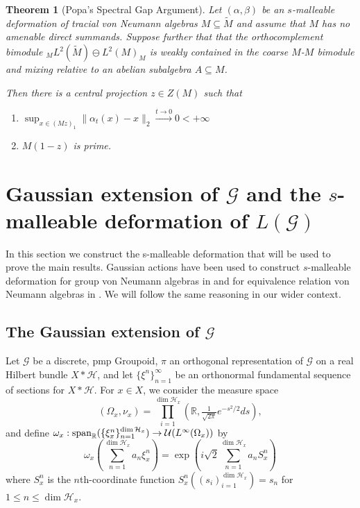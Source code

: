 \documentclass[a4paper,11pt]{article}
\numberwithin{equation}{section}
\newtheorem{thm}{Theorem}[section]
\theoremstyle{definition}
\theoremstyle{remark}
\numberwithin{equation}{section}
\newcommand{\rG}{\mathcal{G}}
\def\H{\mathcal H}
\def\R{\mathbb{R}}
\newcommand{\spn}{{\rm span}}
\newcommand{\U}{\mathcal{U}}
\def\sub{\subseteq}
\providecommand{\norm}[1]{\lVert#1\rVert}
\numberwithin{equation}{section}
\begin{document}
\begin{thm}[Popa's Spectral Gap Argument]\label{popaspectralgap}
    Let $ (\alpha,\beta) $ be an $ s $-malleable deformation of tracial von Neumann algebras $ M\sub \widetilde{M} $ and assume that $M$ has no amenable direct summands. Suppose further that that the orthocomplement bimodule $_{M} L^2(\widetilde{M}) \ominus L^2(M)_M $ is weakly contained in the coarse $M$-$M$ bimodule and mixing relative to an abelian subalgebra $A\sub M$.

    Then there is a central projection $z\in Z(M)$ such that 
    \begin{enumerate}
        \item $ \sup_{x\in (Mz)_{1}} \norm{\alpha_{t}(x)-x}_{2} \xrightarrow{t\to0}0 < +\infty $
        \item $M(1-z)$ is prime.
    \end{enumerate}
    
    
\end{thm}









\section{Gaussian extension of $\rG$ and the $s$-malleable deformation of $L(\rG)$} 

In this section we construct the s-malleable deformation that will be used to prove the main results. Gaussian actions have been used to construct $s$-malleable deformation for group von Neumann algebras in \cite{dSHH:21, ps:12, sinclair:11} and for equivalence relation von Neumann algebras in \cite{hoff:16}. We will follow the same reasoning in our wider context. 

\subsection{The Gaussian extension of $\rG$} 
Let $ \rG $ be a discrete, pmp Groupoid, $\pi$ an orthogonal representation of $\rG$ on a real Hilbert bundle $X \ast \H$, and let $\{\xi^n\}_{n = 1}^\infty$ be an orthonormal fundamental sequence of sections for $X \ast \H$. For $x\in X$, we consider the measure space
\begin{equation}
    (\Omega_x, \nu_x) = \prod_{i = 1}^{\dim \H_x} (\R, \tfrac{1}{\sqrt{2\pi}}e^{-s^2/2}ds),
\end{equation}
and define $\omega_x: \spn_\R (\{\xi_x^n\}_{n = 1}^{\dim \H_x}) \to \U(L^\infty(\Omega_x))$ by
\begin{equation}
    \omega_x\left(\sum_{n = 1}^{\dim \H_x} a_n\xi_x^{n}\right) = \exp\left({i\sqrt{2}\sum_{n = 1}^{\dim \H_x} a_nS_x^{n}}\right)
\end{equation} where $S^n_x$ is the $n$th-coordinate function $S_x^n((s_i)_{i = 1}^{\dim \H_x}) = s_n$ for $1\le n \le \dim \H_x$.
\end{document}
